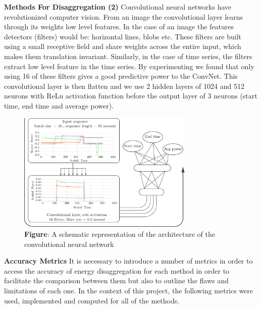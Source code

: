 \documentclass[landscape,fontscale=0.48,margin=2cm,paperwidth=135truecm,paperheight=89truecm]{baposter}
\begin{document}
\begin{poster}
\begin{posterbox}[column=2]{\LARGE \bfseries Methods For Disaggregation (2)}
Convolutional neural networks have revolutionized computer vision. From an image the convolutional layer learns through its weights low level features. In the case of an image the features detectors (filters) would be: horizontal lines, blobs etc. These filters are built using a small receptive field and share weights across the entire input, which makes them translation invariant. Similarly, in the case of time series, the filters extract low level feature in the time series. By experimenting we found that only using 16 of these filters gives a good predictive power to the ConvNet. This convolutional layer is then flatten and we use 2 hidden layers of 1024 and 512 neurons with ReLu activation function before the output layer of 3 neurons (start time, end time and average power).


\begin{figure}
\begin{center}
\includegraphics[width=0.75\textwidth]{convnet_architecture}
\caption*{\footnotesize  \textbf{Figure}: A schematic representation of the architecture of the convolutional neural network} \vspace*{-1 cm}
\end{center}
\end{figure}
\vspace{3em}
\end{posterbox}



%
\begin{posterbox}[column=2,below=auto,height = bottom]{\LARGE \bfseries Accuracy Metrics}
It is necessary to introduce a number of metrics in order to access the accuracy of energy disaggregation for each method in order to facilitate the comparison between them but also to outline the flaws and limitations of each one. In the context of this project, the following metrics were used, implemented and computed for all of the methods.


\end{posterbox}
\end{poster}
\end{document}
